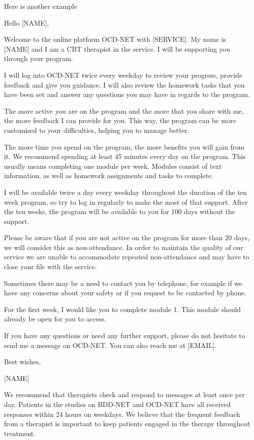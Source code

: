 \documentclass[]{book}
\begin{document}
Here is another example

Hello {[}NAME{]},

Welcome to the online platform OCD-NET with {[}SERVICE{]}. My name is {[}NAME{]} and I am a CBT therapist in the service. I will be supporting you through your program.

I will log into OCD-NET twice every weekday to review your progress, provide feedback and give you guidance. I will also review the homework tasks that you have been set and answer any questions you may have in regards to the program.

The more active you are on the program and the more that you share with me, the more feedback I can provide for you. This way, the program can be more customised to your difficulties, helping you to manage better.

The more time you spend on the program, the more benefits you will gain from it. We recommend spending at least 45 minutes every day on the program. This usually means completing one module per week. Modules consist of text information, as well as homework assignments and tasks to complete.

I will be available twice a day every weekday throughout the duration of the ten week program, so try to log in regularly to make the most of that support. After the ten weeks, the program will be available to you for 100 days without the support.

Please be aware that if you are not active on the program for more than 20 days, we will consider this as non-attendance. In order to maintain the quality of our service we are unable to accommodate repeated non-attendance and may have to close your file with the service.

Sometimes there may be a need to contact you by telephone, for example if we have any concerns about your safety or if you request to be contacted by phone.

For the first week, I would like you to complete module 1. This module should already be open for you to access.

If you have any questions or need any further support, please do not hesitate to send me a message on OCD-NET. You can also reach me at {[}EMAIL{]}.

Best wishes,

{[}NAME{]}

We recommend that therapists check and respond to messages at least once per day. Patients in the studies on BDD-NET and OCD-NET have all received responses within 24 hours on weekdays. We believe that the frequent feedback from a therapist is important to keep patients engaged in the therapy throughout treatment.
\end{document}
